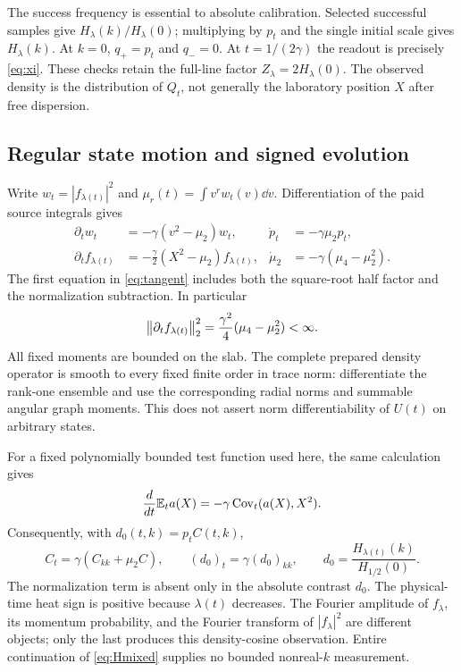 The success frequency is essential to absolute calibration. Selected
successful samples give $H_\lambda(k)/H_\lambda(0)$; multiplying by $p_t$
and the single initial scale gives $H_\lambda(k)$. At $k=0$,
$q_+=p_t$ and $q_-=0$. At $t=1/(2\gamma)$ the readout is precisely
\eqref{eq:xi}. These checks retain the full-line factor $Z_\lambda=2H_\lambda(0)$.
The observed density is the distribution of $Q_t$, not generally the
laboratory position $X$ after free dispersion.

\subsection{Regular state motion and signed evolution}
Write $w_t=|f_{\lambda(t)}|^2$ and $\mu_r(t)=\int v^r w_t(v)\dd v$.
Differentiation of the paid source integrals gives
\begin{align}
 \partial_tw_t&=-\gamma(v^2-\mu_2)w_t,
 &\dot p_t&=-\gamma\mu_2p_t,\label{eq:selection}\\
 \partial_tf_{\lambda(t)}&=-\frac\gamma2(X^2-\mu_2)f_{\lambda(t)},
 &\dot\mu_2&=-\gamma(\mu_4-\mu_2^2).\label{eq:tangent}
\end{align}
The first equation in \eqref{eq:tangent} includes both the square-root
half factor and the normalization subtraction. In particular
\begin{equation}\label{eq:speed}
 \left\lVert\partial_tf_{\lambda(t)}\right\rVert_2^2
 =\frac{\gamma^2}{4}(\mu_4-\mu_2^2)<\infty.
\end{equation}
All fixed moments are bounded on the slab. The complete prepared density
operator is smooth to every fixed finite order in trace norm: differentiate
the rank-one ensemble and use the corresponding radial norms and summable
angular graph moments. This does not assert norm differentiability of
$U(t)$ on arbitrary states.

For a fixed polynomially bounded test function used here, the same
calculation gives
\begin{equation}\label{eq:covariance}
 \frac{d}{dt}\mathbb E_t a(X)=-\gamma\operatorname{Cov}_t(a(X),X^2).
\end{equation}
Consequently, with $d_0(t,k)=p_tC(t,k)$,
\begin{equation}\label{eq:heat}
 C_t=\gamma(C_{kk}+\mu_2C),\qquad
 (d_0)_t=\gamma(d_0)_{kk},\qquad
 d_0=\frac{H_{\lambda(t)}(k)}{H_{1/2}(0)}.
\end{equation}
The normalization term is absent only in the absolute contrast $d_0$.
The physical-time heat sign is positive because $\lambda(t)$ decreases.
The Fourier amplitude of $f_\lambda$, its momentum probability, and the
Fourier transform of $|f_\lambda|^2$ are different objects; only the last
produces this density-cosine observation. Entire continuation of
\eqref{eq:Hmixed} supplies no bounded nonreal-$k$ measurement.
